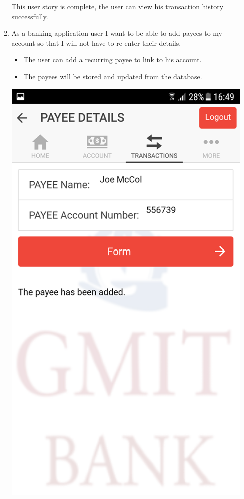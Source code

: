 \begin{itemize}
\begin{enumerate}
\begin{center}
\end{center}
        This user story is complete, the user can view his transaction history successfully.
        \item As a banking application user I want to be able to add payees to my account so that I will not have to re-enter their details.
            \begin{itemize}
                \item The user can add a recurring payee to link to his account.
                \item The payees will be stored and updated from the database.
            \end{itemize}
\begin{center}
    \includegraphics[scale=0.5]{img/15payeeadded.png}

\end{center}
\end{enumerate}
\end{itemize}
